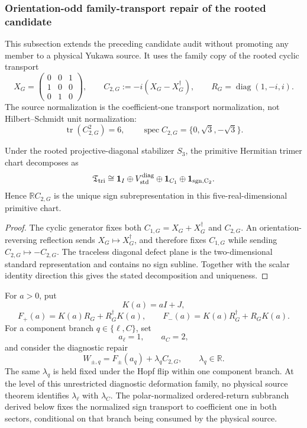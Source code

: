 \documentclass[11pt,a4paper]{article}
\begin{document}
\subsubsection{Orientation-odd family-transport repair of the rooted candidate}
\label{p6:app:v563-oriented-signline-repair}
This subsection extends the preceding candidate audit without promoting any
member to a physical Yukawa source.  It uses the family copy of the rooted
cyclic transport
\[
 X_G=\begin{pmatrix}0&0&1\\1&0&0\\0&1&0\end{pmatrix},
 \qquad
 C_{2,G}:=-i(X_G-X_G^\dagger),
 \qquad
 R_G=\operatorname{diag}(1,-i,i).
\]
The source normalization is the coefficient-one transport normalization,
not Hilbert--Schmidt unit normalization:
\begin{equation}
\label{p6:eq:v563-c2-norm-spectrum}
 \operatorname{tr}(C_{2,G}^2)=6,
 \qquad
 \operatorname{spec}C_{2,G}=\{0,\sqrt3,-\sqrt3\}.
\end{equation}

\begin{proposition}
\label{p6:prop:v563-unique-trimer-sign-line}
Under the rooted projective-diagonal stabilizer \(S_3\), the primitive
Hermitian trimer chart decomposes as
\[
 \mathfrak T_{\rm tri}
 \cong
 \mathbf1_I\oplus V_{\rm std}^{\rm diag}
 \oplus\mathbf1_{C_1}\oplus\mathbf1_{\rm sgn,C_2}.
\]
Hence \(\mathbb R C_{2,G}\) is the unique sign subrepresentation in this
five-real-dimensional primitive chart.
\end{proposition}
\begin{proof}
The cyclic generator fixes both
\(C_{1,G}=X_G+X_G^\dagger\) and \(C_{2,G}\).  An orientation-reversing
reflection sends \(X_G\mapsto X_G^\dagger\), and therefore fixes
\(C_{1,G}\) while sending \(C_{2,G}\mapsto-C_{2,G}\).  The traceless
diagonal defect plane is the two-dimensional standard representation and
contains no sign subline.  Together with the scalar identity direction this
gives the stated decomposition and uniqueness.
\end{proof}

For \(a>0\), put
\[
 K(a)=aI+J,
\]
\[
 F_+(a)=K(a)R_G+R_G^\dagger K(a),
 \qquad
 F_-(a)=K(a)R_G^\dagger+R_GK(a).
\]
For a component branch \(q\in\{\ell,C\}\), set
\[
 a_\ell=1,
 \qquad
 a_C=2,
\]
and consider the diagnostic repair
\begin{equation}
\label{p6:eq:v563-signline-repair}
 \boxed{
 W_{\pm,q}=F_\pm(a_q)+\lambda_q C_{2,G},
 \qquad \lambda_q\in\mathbb R.}
\end{equation}
The same \(\lambda_q\) is held fixed under the Hopf flip within one component
branch.  At the level of this unrestricted diagnostic deformation family, no
physical source theorem identifies \(\lambda_\ell\) with \(\lambda_C\).  The
polar-normalized ordered-return subbranch derived below fixes the normalized
sign transport to coefficient one in both sectors, conditional on that branch
being consumed by the physical source.
\end{document}

